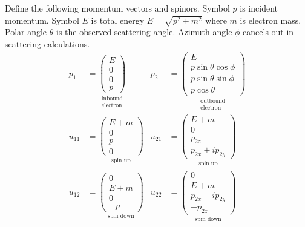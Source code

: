 Define the following momentum vectors and spinors.
Symbol $p$ is incident momentum.
Symbol $E$ is total energy $E=\sqrt{p^2+m^2}$ where $m$ is electron mass.
Polar angle $\theta$ is the observed scattering angle.
Azimuth angle $\phi$ cancels out in scattering calculations.
\iffalse
\begin{align*}
p_1&=
\underset{\substack{\text{inbound}\\\text{electron}}}
{
\begin{pmatrix}E\\0\\0\\p\end{pmatrix}
}
&
p_2&=
\underset{\substack{\text{outbound}\\\text{electron}}}
{
\begin{pmatrix}
E\\
p\sin\theta\cos\phi\\
p\sin\theta\sin\phi\\
p\cos\theta
\end{pmatrix}
}
\\[1ex]
u_{11}&=
\underset{\text{spin up}}
{
\begin{pmatrix}E+m\\0\\p\\0\end{pmatrix}
}
&
u_{21}&=
\underset{\text{spin up}}
{
\begin{pmatrix}E+m\\0\\p_{2z}\\p_{2x}+ip_{2y}\end{pmatrix}
}
\\[1ex]
u_{12}&=
\underset{\text{spin down}}
{
\begin{pmatrix}0\\E+m\\0\\-p\end{pmatrix}
}
&
u_{22}&=
\underset{\text{spin down}}
{
\begin{pmatrix}0\\E+m\\p_{2x}-ip_{2y}\\-p_{2z}\end{pmatrix}
}
\end{align*}
\else
